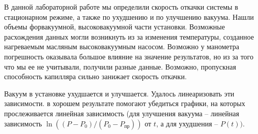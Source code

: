 \documentclass[a4paper,12pt]{article}
\begin{document}
    В данной лабораторной работе мы определили скорость откачки системы в стационарном режиме, а также по ухудшению и по улучшению вакуума. 
    Нашли объемы форвакуумной, высоковакуумной части установки. 
    Возможные расхождения данных могли возникнуть из за изменения температуры, созданное нагреваемым масляным высоковакуумным насосом. Возможно у манометра погрешность оказывала большое влияние на значение результатов, но из за того что мы ее не учитывали, получили разные данные. 
    Возможно, пропускная способность капилляра сильно занижает скорость откачки. 

    Вакуум в установке ухудшается и улучшается. Удалось линеаризовать эти зависимости.  в хорошем результате помогают убедиться графики, на которых прослеживается линейная зависимость (для улучшения вакуума -- линейная зависимость $\ln ((P-P_0) / (P_0 - P_{пр}))$ от $t$, а для ухудшения -- $P(t))$.  
\end{document}
